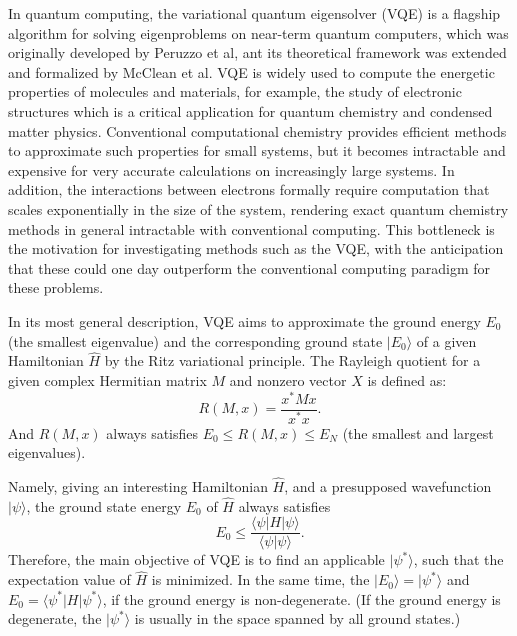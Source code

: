 In quantum computing, the variational quantum eigensolver (VQE) is a flagship algorithm for solving eigenproblems on near-term quantum computers, which was originally developed by Peruzzo et al, ant its theoretical framework was extended and formalized by McClean et al.
VQE is widely used to compute the energetic properties of molecules and materials, for example, the study of electronic structures which is a critical application for quantum chemistry and condensed matter physics.
Conventional computational chemistry provides efficient methods to approximate such properties for small systems, but it becomes intractable and expensive for very accurate calculations on increasingly large systems. In addition, the interactions between electrons formally require computation that scales exponentially in the size of the system, rendering exact quantum chemistry methods in general intractable with conventional computing.
This bottleneck is the motivation for investigating methods such as the VQE, with the anticipation that these could one day outperform the conventional computing paradigm for these problems.

In its most general description, VQE aims to approximate the ground energy $E_0$ (the smallest eigenvalue) and the corresponding ground state $|E_0\rangle$ of a given Hamiltonian $\hat{H}$ by the Ritz variational principle.
The Rayleigh quotient for a given complex Hermitian matrix $M$ and nonzero vector $X$ is defined as:
\begin{equation}
    R(M,x)=\frac{x^*Mx}{x^*x}.
\end{equation}
And $R(M,x)$ always satisfies $E_0\leq R(M,x)\leq E_N$ (the smallest and largest eigenvalues).

Namely, giving an interesting Hamiltonian $\hat{H}$, and a presupposed wavefunction $|\psi\rangle$, the ground state energy $E_{0}$ of $\hat{H}$ always satisfies
\begin{equation}
    E_0 \leq \frac{\langle \psi |H| \psi \rangle}{\langle \psi |\psi\rangle}.
\end{equation}
Therefore, the main objective of VQE is to find an applicable $|\psi^*\rangle$, such that the expectation value of $\hat{H}$ is minimized. In the same time, the $|E_0\rangle = |\psi^*\rangle$ and $E_0 = \langle \psi^* |H| \psi^* \rangle$, if the ground energy is non-degenerate. (If the ground energy is degenerate, the $|\psi^*\rangle$ is usually in the space spanned by all ground states.)

